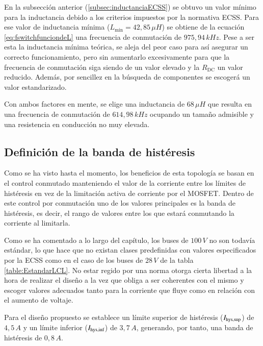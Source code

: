 \documentclass[12pt]{report} %
\begin{document}
En la subsección anterior (\ref{subsec:inductanciaECSS}) se obtuvo un valor mínimo para la inductancia debido a los criterios impuestos por la normativa ECSS. Para ese valor de inductancia mínima ($L_\text{min} = 42{,}85\,\mu H$) se obtiene de la ecuación \ref{eq:fswitchfunciondeL} una frecuencia de conmutación de $975{,}94\,kHz$. 
Pese a ser esta la inductancia mínima teórica, se aleja del peor caso para así asegurar un correcto funcionamiento, pero sin aumentarlo excesivamente para que la frecuencia de conmutación siga siendo de un valor elevado y la $R_\text{DC}$ un valor reducido. Además, por sencillez en la búsqueda de componentes se escogerá un valor estandarizado.

Con ambos factores en mente, se elige una inductancia de $68\,\mu H$ que resulta en una frecuencia de conmutación de $614{,}98\,kHz$ ocupando un tamaño admisible y una resistencia en conducción no muy elevada.

\subsection{Definición de la banda de histéresis}
Como se ha visto hasta el momento, los beneficios de esta topología se basan en el control conmutado manteniendo el valor de la corriente entre los límites de histéresis en vez de la limitación activa de corriente por el MOSFET. Dentro de este control por conmutación uno de los valores principales es la banda de histéresis, es decir, el rango de valores entre los que estará conmutando la corriente al limitarla. 

Como se ha comentado a lo largo del capítulo, los buses de $100\,V$ no son todavía estándar, lo que hace que no existan clases predefinidas con valores especificados por la ECSS como en el caso de los buses de $28\,V$ de la tabla \ref{table:EstandarLCL}. No estar regido por una norma otorga cierta libertad a la hora de realizar el diseño a la vez que obliga a ser coherentes con el mismo y escoger valores adecuados tanto para la corriente que fluye como en relación con el aumento de voltaje.

Para el diseño propuesto se establece un límite superior de histéresis ($I_{\text{hys,sup}}$) de $4{,}5\,A$ y un límite inferior ($I_{\text{hys,inf}}$) de $3{,}7\,A$, generando, por tanto, una banda de histéresis de $0{,}8\,A$. 
\end{document}

